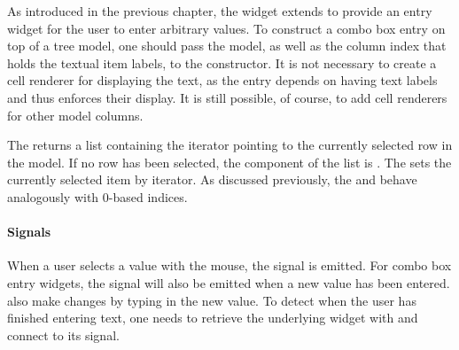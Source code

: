 As introduced in the previous chapter, the 
widget extends  to provide an entry widget for the
user to enter arbitrary values. To construct a combo box entry on top
of a tree model, one should pass the model, as well as the column
index that holds the textual item labels, to the
 constructor. It is not necessary to
create a cell renderer for displaying the text, as the entry depends
on having text labels and thus enforces their display. It is still
possible, of course, to add cell renderers for other model columns.

The  returns a list containing the iterator
pointing to the currently selected row in the model.  If no row has been
selected, the  component of the list is .
The  sets the currently selected
item by iterator. As discussed previously, the
 and 
behave analogously with $0$-based indices.

\paragraph{Signals}

When a user selects a value with the mouse, the  signal
is emitted. For combo box entry widgets, the  signal
will also be emitted when a new value has been entered. also make changes
by typing in the new value. To detect when the user has finished
entering text, one needs to retrieve the underlying 
widget with  and connect to its
 signal.

